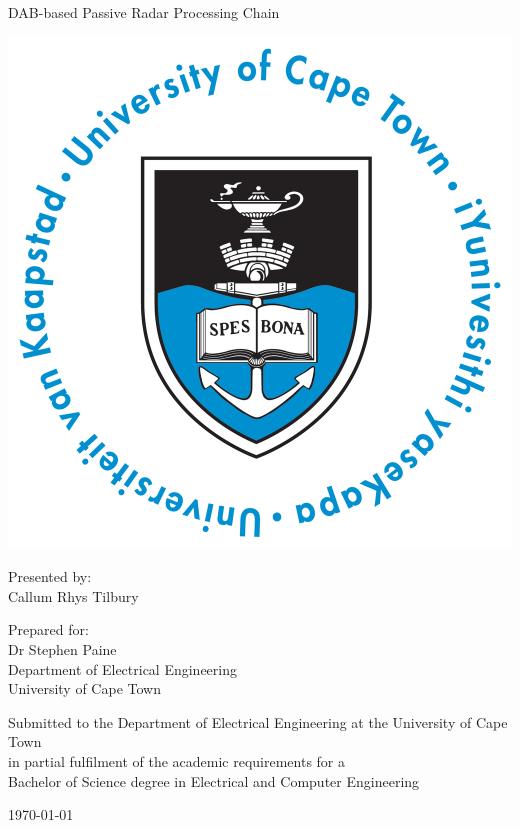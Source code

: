 \thispagestyle{empty}
\begin{center}
    
\Huge

\vspace{5cm}

DAB-based Passive Radar Processing Chain

\vfill

\includegraphics[width=0.4\linewidth]{FrontMatter/UCT_logo.png}

\vspace{2cm}

\large
Presented by:\\
Callum Rhys Tilbury

\vspace{1cm}

Prepared for:\\
Dr Stephen Paine\\
Department of Electrical Engineering\\
University of Cape Town

\vspace{2cm}

\small
Submitted to the Department of Electrical Engineering at the University of Cape Town\\
in partial fulfilment of the academic requirements for a\\
Bachelor of Science degree in Electrical and Computer Engineering

\vspace{2cm}

\today
\end{center}